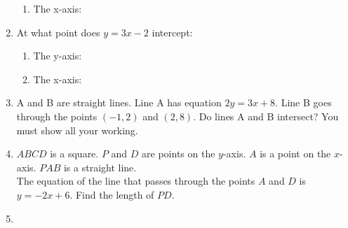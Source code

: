 \begin{enumerate}
\begin{enumerate}
    \item The x-axis:\strch
  \end{enumerate}
  \newpage
  \item At what point does $y = 3x - 2$ intercept:
  \begin{enumerate}
    \item The y-axis: \strch
    \item The x-axis: \strch
  \end{enumerate}
  \item A and B are straight lines. Line A has equation $2y = 3x + 8$. Line B goes through the points $(-1, 2)$ and $(2, 8)$. Do lines A and B intersect? You must show all your working.\strch
  \item \mbox{}
  \begin{figure}[H]
    \centering
  \end{figure}
  $ABCD$ is a square. $P$ and $D$ are points on the $y$-axis. $A$ is a point on the $x$-axis. $PAB$ is a straight line.\\
  The equation of the line that passes through the points $A$ and $D$ is $y = -2x + 6$. Find the length of $PD$.\strch
  \newpage
  \item \mbox{}
  \begin{figure}[H]
    \centering
\end{figure}
\end{enumerate}
